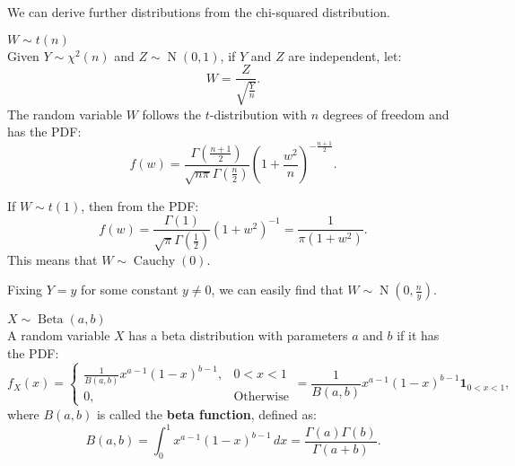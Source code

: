 \documentclass{huhtakm-template-book-v2}
\DeclareMathOperator{\N}{N}
\DeclareMathOperator{\Cauchy}{Cauchy}
\DeclareMathOperator{\Beta}{Beta}
\begin{document}
    We can derive further distributions from the chi-squared distribution.
    \begin{eg} $W \sim t(n)$\\
        Given $Y \sim \chi^{2}(n)$ and $Z \sim \N(0,1)$, if $Y$ and $Z$ are independent, let:
        \begin{equation*}
            W = \frac{Z}{\sqrt{\frac{Y}{n}}}.
        \end{equation*}
        The random variable $W$ follows the $t$-distribution with $n$ degrees of freedom and has the PDF:
        \begin{equation*}
            f(w) = \frac{\Gamma\left(\frac{n+1}{2}\right)}{\sqrt{n\pi}\Gamma\left(\frac{n}{2}\right)}\left(1+\frac{w^{2}}{n}\right)^{-\frac{n+1}{2}}.
        \end{equation*}
    \end{eg}
    \begin{rem}
        If $W \sim t(1)$, then from the PDF:
        \begin{equation*}
            f(w) = \frac{\Gamma(1)}{\sqrt{\pi}\Gamma\left(\frac{1}{2}\right)}(1+w^{2})^{-1} = \frac{1}{\pi(1+w^{2})}.
        \end{equation*}
        This means that $W \sim \Cauchy(0)$.
    \end{rem}
    \begin{rem}
        Fixing $Y = y$ for some constant $y \neq 0$, we can easily find that $W \sim \N(0,\frac{n}{y})$.
    \end{rem}
    \begin{eg} $X \sim \Beta(a, b)$\\
        A random variable $X$ has a beta distribution with parameters $a$ and $b$ if it has the PDF:
        \begin{equation*}
            f_{X}(x) = \begin{cases}
                \frac{1}{B(a, b)}x^{a-1}(1-x)^{b-1}, &0 < x < 1\\
                0, &\text{Otherwise}
            \end{cases} = \frac{1}{B(a, b)}x^{a-1}(1-x)^{b-1}\mathbf{1}_{0 < x < 1},
        \end{equation*}
        where $B(a, b)$ is called the \textbf{beta function}, defined as:
        \begin{equation*}
            B(a, b) = \int_{0}^{1}x^{a-1}(1-x)^{b-1}\,dx = \frac{\Gamma(a)\Gamma(b)}{\Gamma(a+b)}.
        \end{equation*}
    \end{eg}
\end{document}
